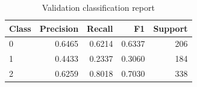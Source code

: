 \begin{table}[htbp]
\centering
\caption{Validation classification report}
\begin{tabular}{lrrrr}
Class & Precision & Recall & F1 & Support \\ \hline
0 & 0.6465 & 0.6214 & 0.6337 & 206 \\
1 & 0.4433 & 0.2337 & 0.3060 & 184 \\
2 & 0.6259 & 0.8018 & 0.7030 & 338 \\
\end{tabular}
\end{table}